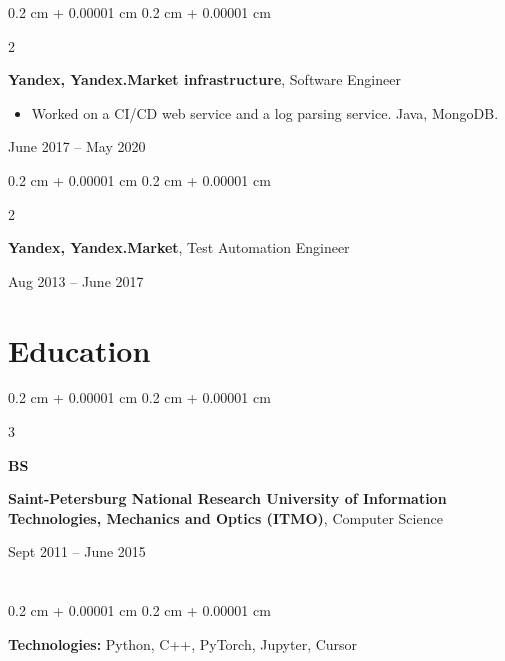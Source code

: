 \documentclass[11pt, letterpaper]{article}
\newenvironment{highlights}{
    \begin{itemize}[
        topsep=0.10 cm,
        parsep=0.10 cm,
        partopsep=0pt,
        itemsep=0pt,
        leftmargin=0.4 cm + 10pt
    ]
}{
    \end{itemize}
} %
\newenvironment{onecolentry}{
    \begin{adjustwidth}{
        0.2 cm + 0.00001 cm
    }{
        0.2 cm + 0.00001 cm
    }
}{
    \end{adjustwidth}
} %
\newenvironment{twocolentry}[2][]{
    \onecolentry
    \def\secondColumn{#2}
    \setcolumnwidth{\fill, 4.5 cm}
    \begin{paracol}{2}
}{
    \switchcolumn \raggedleft \secondColumn
    \end{paracol}
    \endonecolentry
} %
\newenvironment{threecolentry}[3][]{
    \onecolentry
    \def\thirdColumn{#3}
    \setcolumnwidth{1 cm, \fill, 4.5 cm}
    \begin{paracol}{3}
    {\raggedright #2} \switchcolumn
}{
    \switchcolumn \raggedleft \thirdColumn
    \end{paracol}
    \endonecolentry
} %
\begin{document}
        \vspace{0.2 cm}

        \begin{twocolentry}{
            June 2017 – May 2020
        }
            \textbf{Yandex, Yandex.Market infrastructure}, Software Engineer
            \begin{highlights}
                \item Worked on a CI/CD web service and a log parsing service. Java, MongoDB.
            \end{highlights}
        \end{twocolentry}


        \vspace{0.2 cm}

        \begin{twocolentry}{
            Aug 2013 – June 2017
        }
            \textbf{Yandex, Yandex.Market}, Test Automation Engineer
        \end{twocolentry}



    
    \section{Education}



        
        \begin{threecolentry}{\textbf{BS}}{
            Sept 2011 – June 2015
        }
            \textbf{Saint-Petersburg National Research University of Information Technologies, Mechanics and Optics (ITMO)}, Computer Science
        \end{threecolentry}


    
    \section{  }



        
        \begin{onecolentry}
            \textbf{Technologies:} Python, C++, PyTorch, Jupyter, Cursor
        \end{onecolentry}


    
\end{document}
